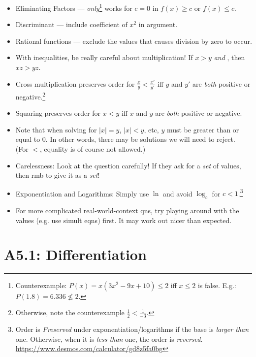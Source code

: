 \documentclass[oneside]{book}
\begin{document}
\begin{IN}
  \begin{itemize}[label=\footnotesize \(\qed\) \normalsize]
    \item \hypertarget{INEQGM3}{Eliminating Factors --- \emph{only}\footnote{Counterexample: \(P(x)=x(3x^2-9x+10) \leq 2\) iff \(x \leq 2\) is false. E.g.: \(P(1.8)=6.336 \not\leq 2\).} works for \(c=0\) in \(f(x) \geq c\) or \(f(x) \leq c\).}
    \item Discriminant --- include coefficient of \(x^2\) in argument.
    \item Rational functions --- exclude the values that causes division by zero to occur.
    \item With inequalities, be really careful about multiplication! If \(x>y\) \emph{and} , then \(xz>yz\). 
    \item Cross multiplication preserves order for \(\frac{x}{y}<\frac{x'}{y'}\) iff \(y\) and \(y'\) are \emph{both} positive or negative.\footnote{Otherwise, note the counterexample \(\frac{1}{2}<\frac{1}{-3}\).}
    \item Squaring preserves order for \(x<y\) iff \(x\) and \(y\) are \emph{both} positive or negative.
    \item  Note that when solving for \(\lvert x \rvert=y\), \(\lvert x \rvert < y\), etc, \(y\) must be greater than or equal to 0. In other words, there may be solutions we will need to reject.\\ \footnotesize(For \(<\), equality is of course not allowed.)
    \item Carelessness: Look at the question carefully! If they ask for a \emph{set} of values, then rmb to give it as a \emph{set}!
    \item Exponentiation and Logarithms: Simply use \(\ln\) and avoid \(\log_c\) for \(c<1\).\footnote{Order is \emph{Preserved} under exponentiation/logarithms if the base is \emph{larger than} one. Otherwise, when it is \emph{less than} one, the order is \emph{reversed}. \url{https://www.desmos.com/calculator/gd8z5fa0bg}}
    \item  For more complicated real-world-context qns, try playing around with the values (e.g. use simult eqns) first. It may work out nicer than expected.
\end{itemize}
\end{IN}

\chapter{A5.1: Differentiation}
\end{document}
